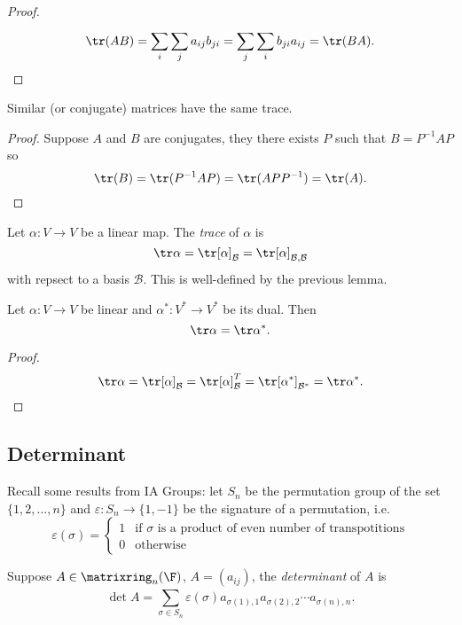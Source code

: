 \documentclass[a4paper]{article}
\newcommand*{\M}{\matrixring}
\newcommand*{\basis}{\mathcal}
\theoremstyle{definition}
\begin{document}
\begin{proof}
  \[
    \tr(AB) = \sum_{i}^{ }\sum_{j}^{ }a_{ij}b_{ji} = \sum_{j}^{ }\sum_{i}^{ }b_{ji}a_{ij} = \tr(BA).
  \]
\end{proof}

\begin{lemma}
  Similar (or conjugate) matrices have the same trace.
\end{lemma}

\begin{proof}
  Suppose \(A\) and \(B\) are conjugates, they there exists \(P\) such that \(B = P^{-1}AP\) so
  \[
    \tr(B) = \tr(P^{-1}AP) = \tr(APP^{-1}) = \tr(A).
  \]
\end{proof}

\begin{definition}[Trace]
  Let \(\alpha: V \to V\) be a linear map. The \emph{trace} of \(\alpha\) is
  \[
    \tr \alpha = \tr[\alpha]_{\basis B} = \tr [\alpha]_{\basis B, \basis B}
  \]
  with repsect to a basis \(\basis B\). This is well-defined by the previous lemma.
\end{definition}

\begin{lemma}
  Let \(\alpha: V \to V\) be linear and \(\alpha^*: V^* \to V^*\) be its dual. Then
  \[
    \tr \alpha = \tr \alpha^*.
  \]
\end{lemma}

\begin{proof}
  \[
    \tr \alpha = \tr [\alpha]_{\basis B} = \tr [\alpha]_{\basis B}^T = \tr[\alpha^*]_{\basis B^*} = \tr \alpha^*.
  \]
\end{proof}

\subsection{Determinant}

Recall some results from IA Groups: let \(S_n\) be the permutation group of the set \(\{1, 2, \dots, n\}\) and \(\varepsilon: S_n \to \{1, -1\}\) be the signature of a permutation, i.e.
\[
  \varepsilon(\sigma) =
  \begin{cases}
    1 &\text{if \(\sigma\) is a product of even number of transpotitions}\\
    0 &\text{otherwise}
  \end{cases}
\]

\begin{definition}[Determinant]
  Suppose \(A \in \M_n(\F)\), \(A = (a_{ij})\), the \emph{determinant} of \(A\) is
  \[
    \det A = \sum_{\sigma \in S_n}^{ } \varepsilon(\sigma) a_{\sigma(1), 1} a_{\sigma(2), 2} \cdots a_{\sigma(n), n}.
  \]
\end{definition}
\end{document}
